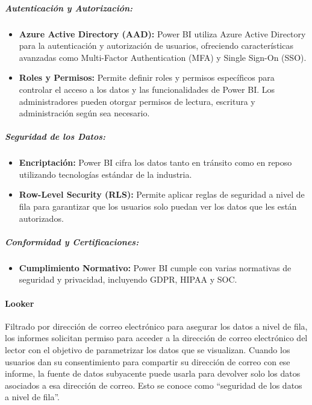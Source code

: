 \documentclass[
  11pt,
  bookmarksnumbered]{article}
\providecommand{\tightlist}{%
  \setlength{\itemsep}{0pt}\setlength{\parskip}{0pt}}
\begin{document}
\hypertarget{autenticaciuxf3n-y-autorizaciuxf3n}{%
\subparagraph{Autenticación y Autorización:}\label{autenticaciuxf3n-y-autorizaciuxf3n}}

\begin{itemize}
\item
  \textbf{Azure Active Directory (AAD):} Power BI utiliza Azure Active Directory para la autenticación y autorización de usuarios, ofreciendo características avanzadas como Multi-Factor Authentication (MFA) y Single Sign-On (SSO).
\item
  \textbf{Roles y Permisos:} Permite definir roles y permisos específicos para controlar el acceso a los datos y las funcionalidades de Power BI. Los administradores pueden otorgar permisos de lectura, escritura y administración según sea necesario.
\end{itemize}

\hypertarget{seguridad-de-los-datos}{%
\subparagraph{Seguridad de los Datos:}\label{seguridad-de-los-datos}}

\begin{itemize}
\item
  \textbf{Encriptación:} Power BI cifra los datos tanto en tránsito como en reposo utilizando tecnologías estándar de la industria.
\item
  \textbf{Row-Level Security (RLS):} Permite aplicar reglas de seguridad a nivel de fila para garantizar que los usuarios solo puedan ver los datos que les están autorizados.
\end{itemize}

\hypertarget{conformidad-y-certificaciones}{%
\subparagraph{Conformidad y Certificaciones:}\label{conformidad-y-certificaciones}}

\begin{itemize}
\tightlist
\item
  \textbf{Cumplimiento Normativo:} Power BI cumple con varias normativas de seguridad y privacidad, incluyendo GDPR, HIPAA y SOC.
\end{itemize}

\hypertarget{looker}{%
\paragraph{Looker}\label{looker}}

Filtrado por dirección de correo electrónico para asegurar los datos a nivel de fila, los informes solicitan permiso para acceder a la dirección de correo electrónico del lector con el objetivo de parametrizar los datos que se visualizan. Cuando los usuarios dan su consentimiento para compartir su dirección de correo con ese informe, la fuente de datos subyacente puede usarla para devolver solo los datos asociados a esa dirección de correo. Esto se conoce como ``seguridad de los datos a nivel de fila''.
\end{document}
